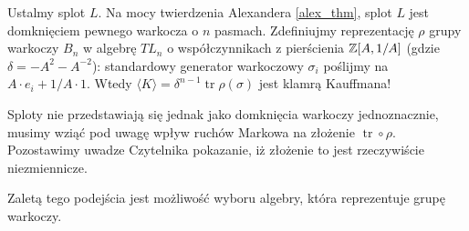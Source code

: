 Ustalmy splot $L$.
Na mocy twierdzenia Alexandera \ref{alex_thm}, splot $L$ jest domknięciem pewnego warkocza o $n$ pasmach.
Zdefiniujmy reprezentację $\rho$ grupy warkoczy $B_n$ w algebrę $TL_n$ o współczynnikach z pierścienia $\mathbb Z[A, 1/A]$ (gdzie $\delta = -A^2 - A^{-2}$): standardowy generator warkoczowy $\sigma_i$ poślijmy na $A \cdot e_i + 1/A \cdot 1$.
Wtedy $\langle K \rangle = \delta^{n-1} \operatorname{tr} \rho (\sigma)$ jest klamrą Kauffmana!

Sploty nie przedstawiają się jednak jako domknięcia warkoczy jednoznacznie, musimy wziąć pod uwagę wpływ ruchów Markowa na złożenie $\operatorname{tr} \circ \rho$.
Pozostawimy uwadze Czytelnika pokazanie, iż złożenie to jest rzeczywiście niezmiennicze.

Zaletą tego podejścia jest możliwość wyboru algebry, która reprezentuje grupę warkoczy.
